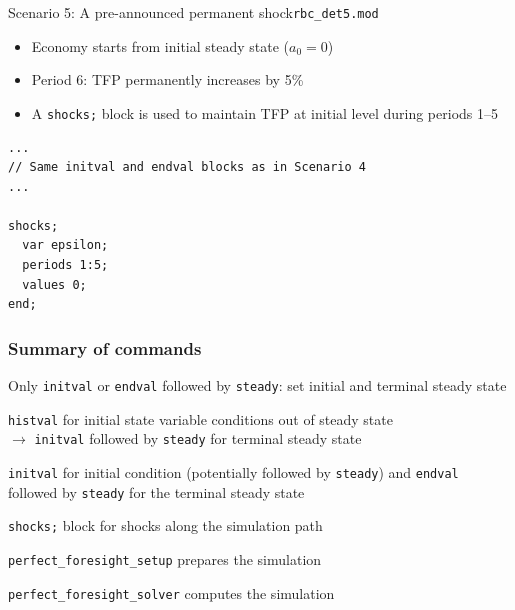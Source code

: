 \documentclass[handout,usepdftitle=false,xcolor=dvipsnames,aspectratio=169]{beamer}
\begin{document}
\begin{frame}[fragile]{Scenario 5: A pre-announced permanent shock}{\texttt{rbc\_det5.mod}}
  \begin{itemize}
    \item Economy starts from initial steady state ($a_0=0$)
    \item Period 6: TFP permanently increases by 5\%
    \item A \texttt{shocks;} block is used to maintain TFP at initial level
          during periods 1--5
  \end{itemize}

  \begin{verbatim}
...
// Same initval and endval blocks as in Scenario 4
...

shocks;
  var epsilon;
  periods 1:5;
  values 0;
end;
\end{verbatim}
\end{frame}

\begin{frame}
  \frametitle{Summary of commands}
  \begin{witemize}
    \item[1.] Only \texttt{initval} or \texttt{endval} followed by \texttt{steady}: set initial and terminal steady state
    \item[2.] \texttt{histval} for initial state variable conditions out of steady
    state\\
    $\rightarrow$ \texttt{initval} followed by \texttt{steady} for terminal steady state
    \item[3.] \texttt{initval} for initial condition (potentially followed by \texttt{steady}) and \texttt{endval} followed by \texttt{steady} for the terminal steady state
    \item \texttt{shocks;} block for shocks along the simulation path
    \item \texttt{perfect\_foresight\_setup} prepares the simulation
    \item \texttt{perfect\_foresight\_solver} computes the simulation
  \end{witemize}
\end{frame}
\end{document}
